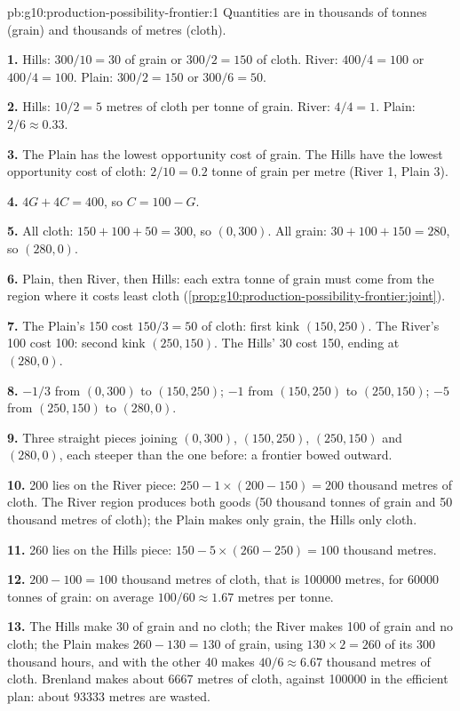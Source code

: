 \begin{solution}{pb:g10:production-possibility-frontier:1}
Quantities are in thousands of tonnes (grain) and thousands of metres (cloth).

\textbf{1.} Hills: $300/10 = 30$ of grain or $300/2 = 150$ of cloth. River: $400/4 = 100$ or $400/4 = 100$.
Plain: $300/2 = 150$ or $300/6 = 50$.

\textbf{2.} Hills: $10/2 = 5$ metres of cloth per tonne of grain. River: $4/4 = 1$. Plain: $2/6 \approx
0.33$.

\textbf{3.} The Plain has the lowest opportunity cost of grain. The Hills have the lowest opportunity cost
of cloth: $2/10 = 0.2$ tonne of grain per metre (River 1, Plain 3).

\textbf{4.} $4G + 4C = 400$, so $C = 100 - G$.

\textbf{5.} All cloth: $150 + 100 + 50 = 300$, so $(0, 300)$. All grain: $30 + 100 + 150 = 280$, so
$(280, 0)$.

\textbf{6.} Plain, then River, then Hills: each extra tonne of grain must come from the region where it
costs least cloth (\cref{prop:g10:production-possibility-frontier:joint}).

\textbf{7.} The Plain's 150 cost $150/3 = 50$ of cloth: first kink $(150, 250)$. The River's 100 cost 100:
second kink $(250, 150)$. The Hills' 30 cost 150, ending at $(280, 0)$.

\textbf{8.} $-1/3$ from $(0, 300)$ to $(150, 250)$; $-1$ from $(150, 250)$ to $(250, 150)$; $-5$ from
$(250, 150)$ to $(280, 0)$.

\textbf{9.} Three straight pieces joining $(0, 300)$, $(150, 250)$, $(250, 150)$ and $(280, 0)$, each
steeper than the one before: a frontier bowed outward.

\textbf{10.} 200 lies on the River piece: $250 - 1 \times (200 - 150) = 200$ thousand metres of cloth. The
River region produces both goods (50 thousand tonnes of grain and 50 thousand metres of cloth); the Plain
makes only grain, the Hills only cloth.

\textbf{11.} 260 lies on the Hills piece: $150 - 5 \times (260 - 250) = 100$ thousand metres.

\textbf{12.} $200 - 100 = 100$ thousand metres of cloth, that is \num{100000} metres, for \num{60000}
tonnes of grain: on average $100/60 \approx 1.67$ metres per tonne.

\textbf{13.} The Hills make 30 of grain and no cloth; the River makes 100 of grain and no cloth; the Plain
makes $260 - 130 = 130$ of grain, using $130 \times 2 = 260$ of its 300 thousand hours, and with the other
40 makes $40/6 \approx 6.67$ thousand metres of cloth. Brenland makes about \num{6667} metres of cloth,
against \num{100000} in the efficient plan: about \num{93333} metres are wasted.


\end{solution}
